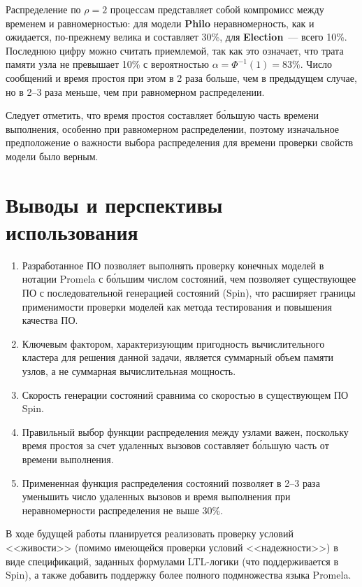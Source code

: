 \documentclass[12pt,a4paper,fleqn]{article}
\newcommand{\Code}[1]{\textbf{\mbox{#1}}}
\begin{document}
Распределение по $\rho = 2$ процессам представляет собой компромисс между временем и равномерностью:
для модели \Code{Philo} неравномерность, как и ожидается, по-прежнему велика и составляет 30\%, для
\Code{Election}~--- всего 10\%. Последнюю цифру можно считать приемлемой, так как это означает, что
трата памяти узла не превышает 10\% с вероятностью $\alpha = \Phi^{-1}(1) = 83\%$. Число сообщений и
время простоя при этом в 2 раза больше, чем в предыдущем случае, но в 2--3 раза меньше, чем при
равномерном распределении.

Следует отметить, что время простоя составляет б\'{о}льшую часть времени выполнения, особенно при
равномерном распределении, поэтому изначальное предположение о важности выбора распределения для
времени проверки свойств модели было верным.

\section{Выводы и перспективы использования}

\begin{enumerate}
\item Разработанное ПО позволяет выполнять проверку конечных моделей в нотации Promela с
  б\'{о}льшим числом состояний, чем позволяет существующее ПО с последовательной
  генерацией состояний (Spin), что расширяет границы применимости проверки моделей как
  метода тестирования и повышения качества ПО.
\item Ключевым фактором, характеризующим пригодность вычислительного кластера для решения
  данной задачи, является суммарный объем памяти узлов, а не суммарная вычислительная
  мощность.
\item Скорость генерации состояний сравнима со скоростью в существующем ПО Spin.
\item Правильный выбор функции распределения между узлами важен, поскольку время простоя
  за счет удаленных вызовов составляет б\'{о}льшую часть от времени выполнения.
\item Примененная функция распределения состояний позволяет в 2--3 раза уменьшить число
  удаленных вызовов и время выполнения при неравномерности распределения не выше 30\%.
\end{enumerate}

В ходе будущей работы планируется реализовать проверку условий <<живости>> (помимо
имеющейся проверки условий <<надежности>>) в виде спецификаций, заданных формулами
LTL-логики (что поддерживается в Spin), а также добавить поддержку более полного
подмножества языка Promela.
\end{document}
